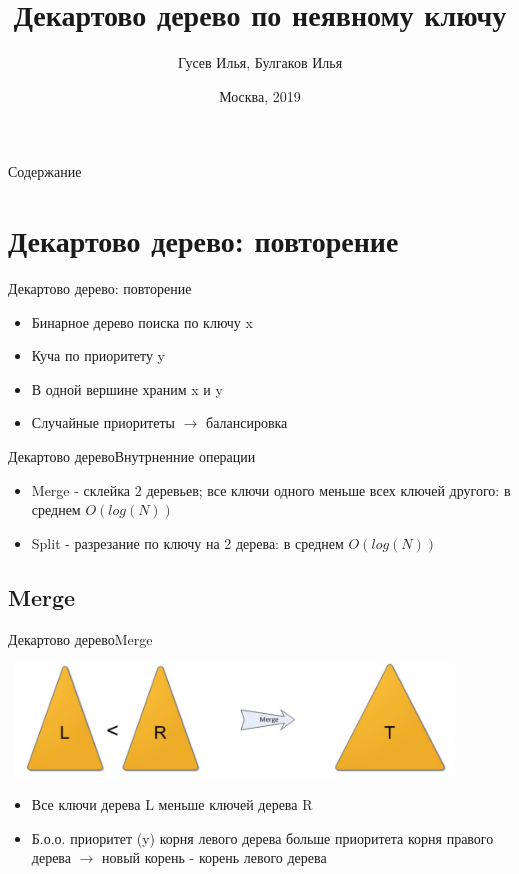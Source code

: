\documentclass[10pt]{beamer}
\title[\href{https://goo.gl/NRgp8K}{https://goo.gl/NRgp8K} (Term 3)]{Декартово дерево по неявному ключу}
\author[Гусев Илья, Булгаков Илья]{Гусев Илья, Булгаков Илья}
\institute[МФТИ] 
{Московский физико-технический институт\\*}
\date{Москва, 2019}
\begin{document}
\begin{frame}
  \titlepage
\end{frame}

\begin{frame}{Содержание}
\tableofcontents
\end{frame}

\section{Декартово дерево: повторение}
\begin{frame}[fragile]{Декартово дерево: повторение}
\begin{itemize}
    \item Бинарное дерево поиска по ключу x
    \item Куча по приоритету y
    \item В одной вершине храним x и y
    \item Случайные приоритеты $\rightarrow$ балансировка
\end{itemize}
\end{frame}

\begin{frame}[fragile]{Декартово дерево}{Внутрненние операции}
\begin{itemize}
    \item Merge - склейка 2 деревьев; все ключи одного меньше всех ключей другого: в среднем $O(log(N))$
    \item Split - разрезание по ключу на 2 дерева: в среднем $O(log(N))$
\end{itemize}
\end{frame}

\subsection{Merge}
\begin{frame}[fragile]{Декартово дерево}{Merge}
\begin{center}
    \includegraphics[width=12cm, height=3cm]{Term_1/Source/Pirctures/treap_merge.jpg}\\
\end{center}
\begin{itemize}
    \item Все ключи дерева L меньше ключей дерева R
    \item Б.о.о. приоритет (y) корня левого дерева больше приоритета корня правого дерева $\rightarrow$ новый корень - корень левого дерева
\end{itemize}
\end{frame}
\end{document}
